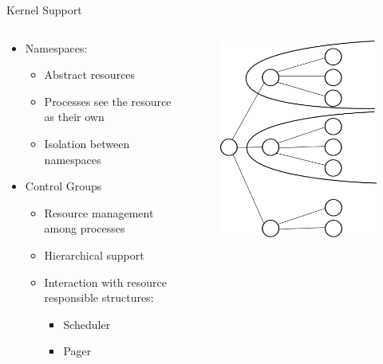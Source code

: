 \begin{frame}{Kernel Support}
	\begin{columns}[C]
		\begin{column}{.6\textwidth}
			\begin{itemize}
			\setlength{\itemsep}{50pt}
			\item Namespaces:
				\begin{itemize}
				\item Abstract resources
				\item Processes see the resource as their own
				\item Isolation between namespaces
				\end{itemize}
			\item Control Groups
				\begin{itemize}
				\item Resource management among processes
				\item Hierarchical support
				\item Interaction with resource responsible structures:
					\begin{itemize}
					\item Scheduler
					\item Pager
					\end{itemize}
				\end{itemize}
			\end{itemize}	
		\end{column}
		\begin{column}{.4\textwidth}
			\begin{figure}[ht]
				\centering
				\includegraphics[scale=0.2]{img/namespaces.png}
			\end{figure}
			

\end{column}
\end{columns}
\end{frame}
